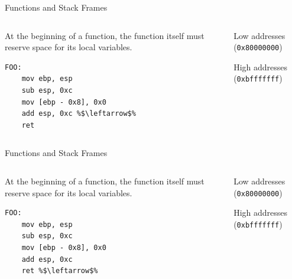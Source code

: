 \documentclass[]{beamer}
\begin{document}
\begin{frame}[fragile]{Functions and Stack Frames}
  \begin{columns}
    \begin{column}{0.45\linewidth}
      At the beginning of a function, the function itself must reserve space for its local variables.
      \begin{lstlisting}[language={[x86masm]Assembler}, escapechar=\%]
FOO:
    mov ebp, esp 
    sub esp, 0xc 
    mov [ebp - 0x8], 0x0 
    add esp, 0xc %$\leftarrow$%
    ret
      \end{lstlisting}
    \end{column}
    \begin{column}{0.4\linewidth}
      \par
      {\scriptsize Low addresses ({\tt 0x80000000})}\\[.5em]
      {\scriptsize High addresses ({\tt 0xbfffffff})}
    \end{column}
  \end{columns}
\end{frame}

\begin{frame}[fragile]{Functions and Stack Frames}
  \begin{columns}
    \begin{column}{0.45\linewidth}
      At the beginning of a function, the function itself must reserve space for its local variables.
      \begin{lstlisting}[language={[x86masm]Assembler}, escapechar=\%]
FOO:
    mov ebp, esp 
    sub esp, 0xc 
    mov [ebp - 0x8], 0x0 
    add esp, 0xc 
    ret %$\leftarrow$%
      \end{lstlisting}
    \end{column}
    \begin{column}{0.4\linewidth}
      \par
      {\scriptsize Low addresses ({\tt 0x80000000})}\\[.5em]
      {\scriptsize High addresses ({\tt 0xbfffffff})}
    \end{column}
  \end{columns}
\end{frame}
\end{document}
